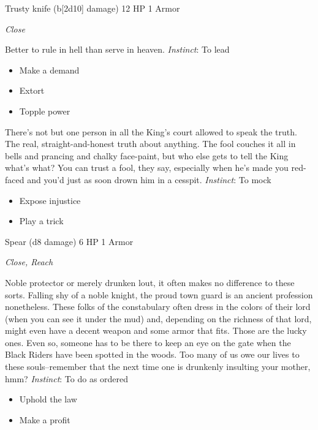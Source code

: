 \HRule
{}

Trusty knife (b[2d10] damage)\hspace*{\fill} 12 HP 1 Armor

\emph{Close}

\HRule
Better to rule in hell than serve in heaven. \emph{Instinct}: To lead
\begin{itemize}
\item Make a demand
\item Extort
\item Topple power
\end{itemize}

\HRule
{}

\HRule
There's not but one person in all the King's court allowed to speak the truth. The real, straight-and-honest truth about anything. The fool couches it all in bells and prancing and chalky face-paint, but who else gets to tell the King what's what? You can trust a fool, they say, especially when he's made you red-faced and you'd just as soon drown him in a cesspit. \emph{Instinct}: To mock
\begin{itemize}
\item Expose injustice
\item Play a trick
\end{itemize}

\HRule
{}

Spear (d8 damage)\hspace*{\fill} 6 HP 1 Armor

\emph{Close, Reach}

\HRule
Noble protector or merely drunken lout, it often makes no difference to these sorts. Falling shy of a noble knight, the proud town guard is an ancient profession nonetheless. These folks of the constabulary often dress in the colors of their lord (when you can see it under the mud) and, depending on the richness of that lord, might even have a decent weapon and some armor that fits. Those are the lucky ones. Even so, someone has to be there to keep an eye on the gate when the Black Riders have been spotted in the woods. Too many of us owe our lives to these souls--remember that the next time one is drunkenly insulting your mother, hmm? \emph{Instinct}: To do as ordered
\begin{itemize}
\item Uphold the law
\item Make a profit
\end{itemize}

